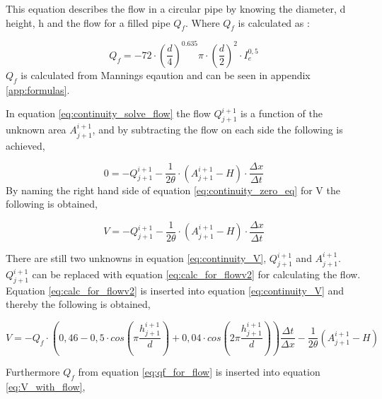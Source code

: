 This equation describes the flow in a circular pipe by knowing the diameter, d height, h and the flow for a filled pipe $Q_f$. Where $Q_f$ is calculated as \cite{ikke_stationear}:

\begin{equation}\label{eq:qf_for_flow}
    Q_f =-72\cdot \left(\frac{d}{4}\right)^{0.635}\pi\cdot\left(\frac{d}{2}\right)^2\cdot I_e^{0,5}%
\end{equation}
$Q_f$ is calculated from Mannings eqaution and can be seen in appendix \ref{app:formulas}.   

In equation \ref{eq:continuity_solve_flow} the flow $Q_{j+1}^{i+1}$ is a function of the unknown area $A_{j+1}^{i+1}$, and by subtracting the flow on each side the following is achieved,

\begin{equation}\label{eq:continuity_zero_eq}
        0=-Q_{j+1}^{i+1}  - \frac{1}{2\theta}\cdot\left(A_{j+1}^{i+1}-H\right)\cdot \frac{\Delta x}{\Delta t}
\end{equation}
By naming the right hand side of equation \ref{eq:continuity_zero_eq} for V the following is obtained,

\begin{equation}\label{eq:continuity_V}
        V=-Q_{j+1}^{i+1}  - \frac{1}{2\theta}\cdot\left(A_{j+1}^{i+1}-H\right)\cdot \frac{\Delta x}{\Delta t}
\end{equation}

There are still two unknowns in equation \ref{eq:continuity_V}, $Q_{j+1}^{i+1}$ and $A_{j+1}^{i+1}$. $Q_{j+1}^{i+1}$ can be replaced with equation \ref{eq:calc_for_flowv2} for calculating the flow. Equation \ref{eq:calc_for_flowv2} is inserted into equation \ref{eq:continuity_V} and thereby the following is obtained,

\begin{equation}\label{eq:V_with_flow}
    V = -Q_f\cdot\left(0,46-0,5\cdot cos\left(\pi \frac{h_{j+1}^{i+1}}{d}\right)+0,04\cdot cos\left(2\pi\frac{h_{j+1}^{i+1}}{d}\right)\right)\frac{\Delta t}{\Delta x}-\frac{1}{2\theta}\left(A_{j+1}^{i+1}-H\right)
\end{equation}

Furthermore $Q_f$ from equation \ref{eq:qf_for_flow} is inserted into equation \ref{eq:V_with_flow},

